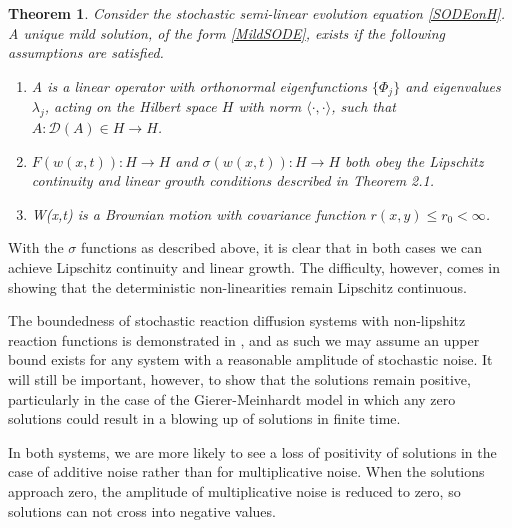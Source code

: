 \documentclass[12pt]{article}
\newtheorem{theorem}{Theorem}[section]
\begin{document}
\begin{theorem}\cite{Chow}
Consider the stochastic semi-linear evolution equation \eqref{SODEonH}. A unique mild solution, of the form \eqref{MildSODE}, exists if the following assumptions are satisfied.
\begin{enumerate}
    \item [(i)] A is a linear operator with orthonormal eigenfunctions $\lbrace \Phi_j \rbrace$ and eigenvalues $\lambda_j$, acting on the Hilbert space $H$ with norm $\langle\cdot,\cdot\rangle$, such that $A:\mathcal{D}(A)\in H \to H$.
    \item [(ii)] $F(w(x,t)):H\rightarrow H$ and $\sigma(w(x,t)):H\rightarrow H$ both obey the Lipschitz continuity and linear growth conditions described in Theorem 2.1.
    \item [(iii)] W(x,t) is a Brownian motion with covariance function $r(x,y) \leq r_0 <\infty$.  
\end{enumerate}
\end{theorem}
With the $\sigma$ functions as described above, it is clear that in both cases we can achieve Lipschitz continuity and linear growth. The difficulty, however, comes in showing that the deterministic non-linearities remain Lipschitz continuous. 

The boundedness of stochastic reaction diffusion systems with non-lipshitz reaction functions is demonstrated in \cite{Cerrai}, and as such we may assume an upper bound exists for any system with a reasonable amplitude of stochastic noise. It will still be important, however, to show that the solutions remain positive, particularly in the case of the Gierer-Meinhardt model in which any zero solutions could result in a blowing up of solutions in finite time.  

In both systems, we are more likely to see a loss of positivity of solutions in the case of additive noise rather than for multiplicative noise. When the solutions approach zero, the amplitude of multiplicative noise is reduced to zero, so solutions can not cross into negative values.
\end{document}
